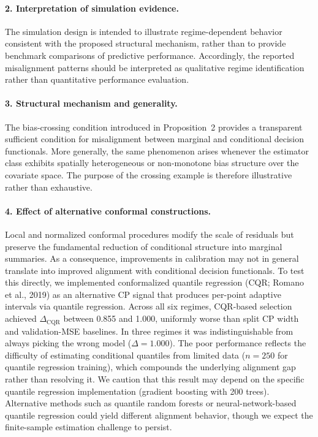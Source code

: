 \documentclass[a4paper,11pt]{article}
\begin{document}
\paragraph{2. Interpretation of simulation evidence.}
The simulation design is intended to illustrate regime-dependent behavior consistent with the proposed structural mechanism, rather than to provide benchmark comparisons of predictive performance. Accordingly, the reported misalignment patterns should be interpreted as qualitative regime identification rather than quantitative performance evaluation.

\paragraph{3. Structural mechanism and generality.}
The bias-crossing condition introduced in Proposition~2 provides a transparent sufficient condition for misalignment between marginal and conditional decision functionals. More generally, the same phenomenon arises whenever the estimator class exhibits spatially heterogeneous or non-monotone bias structure over the covariate space. The purpose of the crossing example is therefore illustrative rather than exhaustive.

\paragraph{4. Effect of alternative conformal constructions.}
Local and normalized conformal procedures modify the scale of residuals but preserve the fundamental reduction of conditional structure into marginal summaries. As a consequence, improvements in calibration may not in general translate into improved alignment with conditional decision functionals. To test this directly, we implemented conformalized quantile regression (CQR; Romano et al., 2019) as an alternative CP signal that produces per-point adaptive intervals via quantile regression. Across all six regimes, CQR-based selection achieved $\Delta_{\text{CQR}}$ between 0.855 and 1.000, uniformly worse than split CP width and validation-MSE baselines. In three regimes it was indistinguishable from always picking the wrong model ($\Delta = 1.000$). The poor performance reflects the difficulty of estimating conditional quantiles from limited data ($n=250$ for quantile regression training), which compounds the underlying alignment gap rather than resolving it. We caution that this result may depend on the specific quantile regression implementation (gradient boosting with 200 trees). Alternative methods such as quantile random forests or neural-network-based quantile regression could yield different alignment behavior, though we expect the finite-sample estimation challenge to persist.
\end{document}
